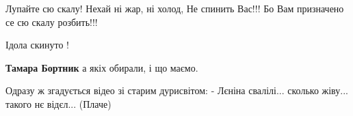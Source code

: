  
 
 
 
 


\obeycr
Лупайте сю скалу!
Нехай ні жар, ні холод,
Не спинить Вас!!!
Бо Вам призначено се сю скалу розбить!!!
\restorecr

Ідола скинуто !

\textbf{Тамара Бортник} а якіх обирали, і що маємо.


Одразу ж згадується відео зі старим дурисвітом: - Лєніна свалілі... сколько жіву...
такого нє відєл... (Плаче)

